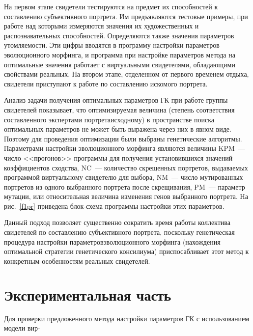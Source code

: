 \begin{multicols}{2}
     На первом этапе свидетели тестируются на предмет их способностей к 
составлению субъективного портрета. Им предъявляются тестовые примеры, 
при работе над которыми измеряются значения их художественных и 
распознавательных способностей. Определяются также значения параметров 
утомляемости. Эти цифры вводятся в программу настройки параметров 
эволюционного морфинга, и программа при настройке параметров метода на 
оптимальные значения работает с виртуальными свидетелями, обладающими 
свойствами реальных. На втором этапе, отделенном от первого временем 
отдыха, свидетели приступают к работе по со\-став\-ле\-нию искомого портрета. 
     
     Анализ задачи получения оптимальных па\-ра\-мет\-ров ГК при работе 
группы свидетелей показывает, что оптимизируемая величина (степень 
соответствия составленного экспертами портрета\linebreak исходному) в пространстве 
поиска оптимальных па\-ра\-мет\-ров не может быть выражена через них в явном 
виде. Поэтому для проведения оптимизации были выбраны генетические 
алгоритмы. Параметрами настройки эволюционного морфинга являются 
величины KPM~--- чис\-ло <<прогонов>> программы для получения 
установившихся значений коэффициентов сходства, NC~--- количество 
скрещенных портретов, выдаваемых программой виртуальному свидетелю для 
выбора, NM~--- чис\-ло мутированных портретов из одного выбранного портрета 
после скрещивания, PM~--- параметр мутации, или относительная величина 
изменения генов выбранного портрета. На рис.~\ref{f1pr} приведена блок-схе\-ма 
программы настройки этих параметров.    
     
     Данный подход позволяет существенно сократить время работы 
коллектива свидетелей по со\-став\-ле\-нию субъективного портрета, поскольку 
генетическая процедура настройки параметров\linebreak эволюционного морфинга 
(нахождения оптимальной стратегии генетического консилиума) 
приспосабливает этот метод к конкретным особенностям реальных свидетелей.
     

\section{Экспериментальная часть}


     Для проверки предложенного метода настройки параметров ГК с 
использованием модели вир-\linebreak\vspace*{-12pt}
\pagebreak


\end{multicols}
